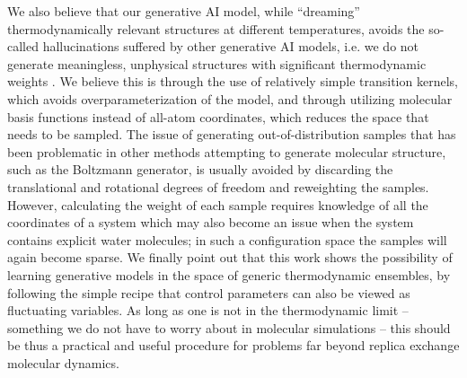 We also believe that our generative AI model, while ``dreaming'' thermodynamically relevant structures at different temperatures, avoids the so-called hallucinations suffered by other generative AI models, i.e. we do not generate meaningless, unphysical structures with significant thermodynamic weights \cite{deep_learning_book}. We believe this is through the use of relatively simple transition kernels, which avoids overparameterization of the model, and through utilizing molecular basis functions instead of all-atom coordinates, which reduces the space that needs to be sampled. The issue of generating out-of-distribution samples that has been problematic in other methods attempting to generate molecular structure, such as the Boltzmann generator, is usually avoided by discarding the translational and rotational degrees of freedom and reweighting the samples.~\cite{Noe2019Boltzmann, stochastic_NF} However, calculating the weight of each sample requires knowledge of all the coordinates of a system which may also become an issue when the system contains explicit water molecules; in such a configuration space the samples will again become sparse.  We finally point out that this work shows the possibility of learning generative models in the space of generic thermodynamic ensembles, by following the simple recipe that control parameters can also be viewed as fluctuating variables. As long as one is not in the thermodynamic limit -- something we do not have to worry about in molecular simulations -- this should be thus a practical and useful procedure for problems far beyond replica exchange molecular dynamics.


